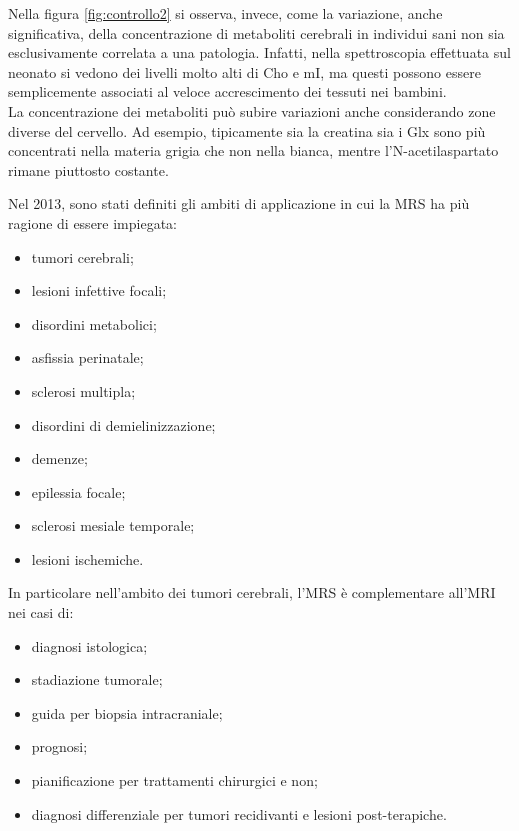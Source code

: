 \documentclass{report}
\newcommand{\figref}[1]{figura \ref{#1}}
\numberwithin{equation}{section}
\numberwithin{figure}{section}
\begin{document}
Nella \figref{fig:controllo2} si osserva, invece, come la variazione, anche significativa, della concentrazione di metaboliti cerebrali in individui sani non sia esclusivamente correlata a una patologia. Infatti, nella spettroscopia effettuata sul neonato si vedono dei livelli molto alti di Cho e mI, ma questi possono essere semplicemente associati al veloce accrescimento dei tessuti nei bambini.\\
La concentrazione dei metaboliti può subire variazioni anche considerando zone diverse del cervello. Ad esempio, tipicamente sia la creatina sia i Glx sono più concentrati nella materia grigia che non nella bianca, mentre l'N-acetilaspartato rimane piuttosto costante.

Nel 2013, sono stati definiti gli ambiti di applicazione in cui la MRS ha più ragione di essere impiegata:
\begin{itemize}[label=$-$]
    \item tumori cerebrali;
    \item lesioni infettive focali;
    \item disordini metabolici;
    \item asfissia perinatale;
    \item sclerosi multipla;
    \item disordini di demielinizzazione;
    \item demenze;
    \item epilessia focale;
    \item sclerosi mesiale temporale;
    \item lesioni ischemiche.
\end{itemize}
In particolare nell'ambito dei tumori cerebrali, l'MRS è complementare all'MRI nei casi di:
\begin{itemize}[label=$-$]
    \item diagnosi istologica;
    \item stadiazione tumorale;
    \item guida per biopsia intracraniale;
    \item prognosi;
    \item pianificazione per trattamenti chirurgici e non;
    \item diagnosi differenziale per tumori recidivanti e lesioni post-terapiche.
\end{itemize}
\end{document}
